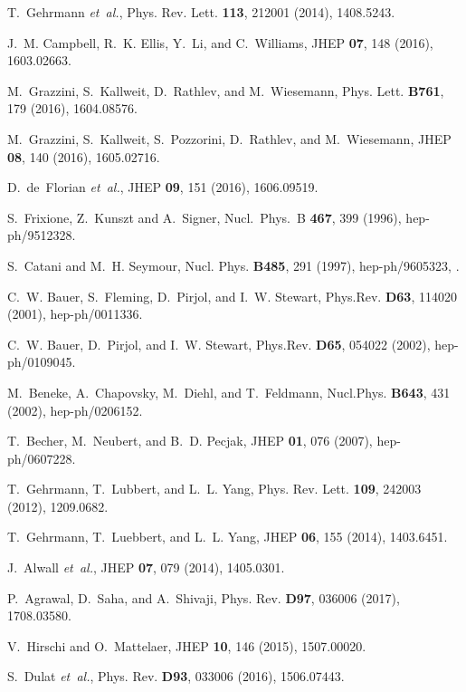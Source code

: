 \documentclass[a4paper,amsmath,preprintnumbers,showpacs,twocolumn,prl,superscriptaddress, nofootinbib]{revtex4}
\begin{document}
\begin{thebibliography}{100}
T.~Gehrmann {\em et~al.},
\newblock Phys. Rev. Lett. {\bf 113}, 212001 (2014), 1408.5243.

J.~M. Campbell, R.~K. Ellis, Y.~Li, and C.~Williams,
\newblock JHEP {\bf 07}, 148 (2016), 1603.02663.

M.~Grazzini, S.~Kallweit, D.~Rathlev, and M.~Wiesemann,
\newblock Phys. Lett. {\bf B761}, 179 (2016), 1604.08576.

M.~Grazzini, S.~Kallweit, S.~Pozzorini, D.~Rathlev, and M.~Wiesemann,
\newblock JHEP {\bf 08}, 140 (2016), 1605.02716.

D.~de~Florian {\em et~al.},
\newblock JHEP {\bf 09}, 151 (2016), 1606.09519.

  S.~Frixione, Z.~Kunszt and A.~Signer,
\newblock  Nucl.\ Phys.\ B {\bf 467}, 399 (1996), hep-ph/9512328.

S.~Catani and M.~H. Seymour,
\newblock Nucl. Phys. {\bf B485}, 291 (1997), hep-ph/9605323,
.

C.~W. Bauer, S.~Fleming, D.~Pirjol, and I.~W. Stewart,
\newblock Phys.Rev. {\bf D63}, 114020 (2001), hep-ph/0011336.

C.~W. Bauer, D.~Pirjol, and I.~W. Stewart,
\newblock Phys.Rev. {\bf D65}, 054022 (2002), hep-ph/0109045.

M.~Beneke, A.~Chapovsky, M.~Diehl, and T.~Feldmann,
\newblock Nucl.Phys. {\bf B643}, 431 (2002), hep-ph/0206152.

T.~Becher, M.~Neubert, and B.~D. Pecjak,
\newblock JHEP {\bf 01}, 076 (2007), hep-ph/0607228.

T.~Gehrmann, T.~Lubbert, and L.~L. Yang,
\newblock Phys. Rev. Lett. {\bf 109}, 242003 (2012), 1209.0682.

T.~Gehrmann, T.~Luebbert, and L.~L. Yang,
\newblock JHEP {\bf 06}, 155 (2014), 1403.6451.

J.~Alwall {\em et~al.},
\newblock JHEP {\bf 07}, 079 (2014), 1405.0301.

P.~Agrawal, D.~Saha, and A.~Shivaji,
\newblock  Phys. Rev. {\bf D97}, 036006 (2017), 1708.03580.

V.~Hirschi and O.~Mattelaer,
\newblock JHEP {\bf 10}, 146 (2015), 1507.00020.

S.~Dulat {\em et~al.},
\newblock Phys. Rev. {\bf D93}, 033006 (2016), 1506.07443.

\end{thebibliography}
\end{document}
